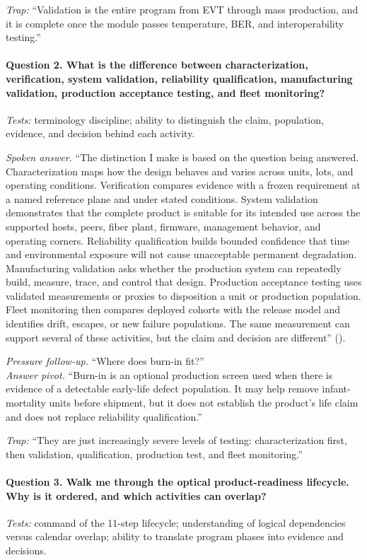 \textit{Trap:} ``Validation is the entire program from EVT through mass
production, and it is complete once the module passes temperature, BER, and
interoperability testing.''

\paragraph{Question 2. What is the difference between characterization,
verification, system validation, reliability qualification, manufacturing
validation, production acceptance testing, and fleet monitoring?}
\textit{Tests:} terminology discipline; ability to distinguish the claim,
population, evidence, and decision behind each activity.

\textit{Spoken answer.}
``The distinction I make is based on the question being answered.
Characterization maps how the design behaves and varies across units, lots, and
operating conditions. Verification compares evidence with a frozen requirement
at a named reference plane and under stated conditions. System validation
demonstrates that the complete product is suitable for its intended use across
the supported hosts, peers, fiber plant, firmware, management behavior, and
operating corners. Reliability qualification builds bounded confidence that time
and environmental exposure will not cause unacceptable permanent degradation.
Manufacturing validation asks whether the production system can repeatedly
build, measure, trace, and control that design. Production acceptance testing
uses validated measurements or proxies to disposition a unit or production
population. Fleet monitoring then compares deployed cohorts with the release
model and identifies drift, escapes, or new failure populations. The same
measurement can support several of these activities, but the claim and decision
are different'' ().

\textit{Pressure follow-up.} ``Where does burn-in fit?''\\
\textit{Answer pivot.} ``Burn-in is an optional production screen used when
there is evidence of a detectable early-life defect population. It may help
remove infant-mortality units before shipment, but it does not establish the
product's life claim and does not replace reliability qualification.''

\textit{Trap:} ``They are just increasingly severe levels of testing:
characterization first, then validation, qualification, production test, and
fleet monitoring.''

\paragraph{Question 3. Walk me through the optical product-readiness lifecycle.
Why is it ordered, and which activities can overlap?}
\textit{Tests:} command of the 11-step lifecycle; understanding of logical
dependencies versus calendar overlap; ability to translate program phases into
evidence and decisions.

